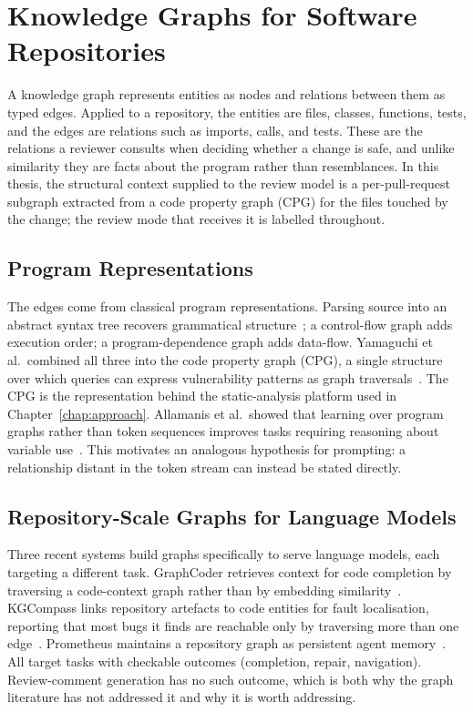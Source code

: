 \section{Knowledge Graphs for Software Repositories}
\label{sec:bg-kg}

A knowledge graph represents entities as nodes and relations between them as
typed edges. Applied to a repository, the entities are files, classes,
functions, tests, and the edges are relations such as imports, calls, and
tests. These are the relations a reviewer consults when deciding whether a
change is safe, and unlike similarity they are facts about the program rather
than resemblances. In this thesis, the structural context supplied to the
review model is a per-pull-request subgraph extracted from a code property
graph (CPG) for the files touched by the change; the review mode that
receives it is labelled \kg{} throughout.

\subsection{Program Representations}

The edges come from classical program representations. Parsing source into an
abstract syntax tree recovers grammatical structure~\cite{aho2006compilers}; a
control-flow graph adds execution order; a program-dependence graph adds
data-flow. Yamaguchi et al.\ combined all three into the code property graph
(CPG), a single structure over which queries can express vulnerability patterns
as graph traversals~\cite{yamaguchi2014cpg}. The CPG is the representation
behind the static-analysis platform used in Chapter~\ref{chap:approach}.
Allamanis et al.\ showed that learning over program graphs rather than token
sequences improves tasks requiring reasoning about variable
use~\cite{allamanis2018programgraphs}. This motivates an analogous hypothesis
for prompting: a relationship distant in the token stream can instead be
stated directly.

\subsection{Repository-Scale Graphs for Language Models}

Three recent systems build graphs specifically to serve language models, each
targeting a different task. GraphCoder retrieves context for code completion by
traversing a code-context graph rather than by embedding
similarity~\cite{liu2024graphcoder}. KGCompass links repository artefacts to
code entities for fault localisation, reporting that most bugs it finds are
reachable only by traversing more than one
edge~\cite{yang2025kgcompass}. Prometheus maintains a repository graph as
persistent agent memory~\cite{pan2025prometheus}. All target tasks with
checkable outcomes (completion, repair, navigation). Review-comment
generation has no such outcome, which is both why the graph literature has not
addressed it and why it is worth addressing.

